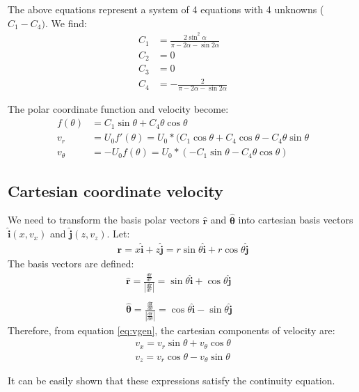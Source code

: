 \documentclass[a4paper,11pt]{article}
\begin{document}
The above equations represent a system of 4 equations with 4 unknowns ($C_1-C_4)$. We find:
\begin{align}
C_1 &= \frac{\displaystyle 2\sin^2\alpha}{\displaystyle \pi-2\alpha-\sin2\alpha} \\
C_2 &= 0\\
C_3 &= 0\\
C_4 &= -\frac{\displaystyle 2}{\displaystyle \pi-2\alpha-\sin2\alpha} 
\end{align}

The polar coordinate function and velocity become:
\begin{align}
f(\theta) &= C_1\sin\theta+C_4\theta\cos\theta \\
v_r&= U_0 f'(\theta) = U_0*(C_1\cos\theta+C_4\cos\theta-C_4\theta\sin\theta\\
v_\theta&=-U_0 f(\theta) = U_0*(-C_1\sin\theta-C_4\theta\cos\theta)
\end{align}

\subsection{Cartesian coordinate velocity}
We need to transform the basis polar vectors $\hat{\textbf{r}}$ and $\hat{\bm{\theta}}$ into cartesian basis vectors $\hat{\textbf{i}}(x,v_x)$ and $\hat{\textbf{j}}(z,v_z)$. Let:
\begin{align}
\textbf{r} = x\hat{\textbf{i}}+z\hat{\textbf{j}} = r\sin\theta\hat{\textbf{i}} + r\cos\theta\hat{\textbf{j}}
\end{align}
The basis vectors are defined: 
\begin{align}
\hat{\textbf{r}} = \frac{\frac{d\textbf{r}}{dr}}{\left|\frac{d\textbf{r}}{dr}\right|} = \sin\theta\hat{\textbf{i}} + \cos\theta\hat{\textbf{j}}\\
&\nonumber  \\
\hat{\bm{\theta}} = \frac{\frac{d\textbf{r}}{d\theta}}{\left|\frac{d\textbf{r}}{d\theta}\right|} = \cos\theta\hat{\textbf{i}} - \sin\theta\hat{\textbf{j}}
\end{align}
Therefore, from equation \ref{eq:vgen}, the cartesian components of velocity are:
\begin{align}
v_x = v_r\sin\theta + v_\theta\cos\theta \label{eq:vx}\\
v_z = v_r\cos\theta - v_\theta\sin\theta \label{eq:vz}
\end{align}

It can be easily shown that these expressions satisfy the continuity equation. 
\end{document}
